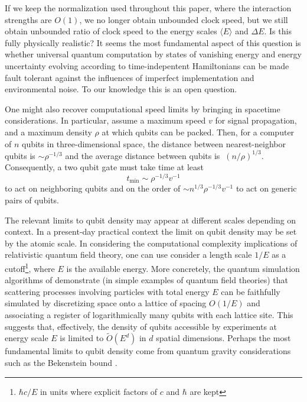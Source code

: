 \documentclass[11pt]{article}
\begin{document}
If we keep the normalization used throughout this paper, where the interaction strengths are $O(1)$, we no longer obtain unbounded clock speed, but we still obtain unbounded ratio of clock speed to the energy scales $\langle E \rangle$ and $\Delta E$. Is this fully physically realistic? It seems the most fundamental aspect of this question is whether universal quantum computation by states of vanishing energy and energy uncertainty evolving according to time-indepentent Hamiltonians can be made fault tolerant against the influences of imperfect implementation and environmental noise. To our knowledge this is an open question.

One might also recover computational speed limits by bringing in spacetime considerations. In particular, assume a maximum speed $v$ for signal propagation, and a maximum density $\rho$ at which qubits can be packed. Then, for a computer of $n$ qubits in three-dimensional space, the distance between nearest-neighbor qubits is $\sim \rho^{-1/3}$ and the average distance between qubits is $~( n/\rho)^{1/3}$. Consequently, a two qubit gate must take time at least 
\begin{equation}
\label{tmin}
t_{\min} \sim \rho^{-1/3} v^{-1}
\end{equation}
to act on neighboring qubits and on the order of $\sim n^{1/3} \rho^{-1/3} v^{-1}$ to act on generic pairs of qubits.

The relevant limits to qubit density may appear at different scales depending on context. In a present-day practical context the limit on qubit density may be set by the atomic scale. In considering the computational complexity implications of relativistic quantum field theory, one can use consider a length scale $1/E$ as a cutoff\footnote{$\hbar c/E$ in units where explicit factors of $c$ and $\hbar$ are kept}, where $E$ is the available energy. More concretely, the quantum simulation algorithms of \cite{JLP12, JLP14, JLP14b} demonstrate (in simple examples of quantum field theories) that scattering processes involving particles with total energy $E$ can be faithfully simulated by discretizing space onto a lattice of spacing $O(1/E)$ and associating a register of logarithmically many qubits with each lattice site. This suggests that, effectively, the density of qubits accessible by experiments at energy scale $E$ is limited to $\widetilde{O}(E^d)$ in $d$ spatial dimensions. Perhaps the most fundamental limits to qubit density come from quantum gravity considerations such as the Bekenstein bound \cite{Bbound2, Bbound, Bousso02}. 
\end{document}
